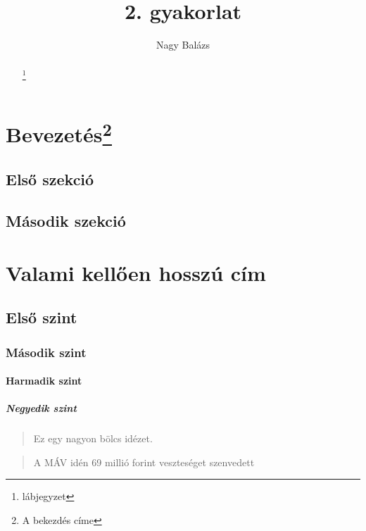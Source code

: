 \documentclass[12pt, twoside, twocolumn]{article}
\author{Nagy Balázs}
\title{2. gyakorlat}
\begin{document}
\setcounter{secnumdepth}{5}
\setcounter{tocdepth}{5}
\maketitle

\begin{abstract}
\hulipsum[4]
\footnote[5]{lábjegyzet}
\end{abstract}
\clearpage

\tableofcontents
{}

\clearpage

\section[Prologue]{Bevezetés\footnote[4]{A bekezdés címe}}

\subsection{Első szekció}
\hulipsum[4]

\subsection{Második szekció}
\marginpar{\hulipsum[1]}
\hulipsum[13]

\section{Valami kellően hosszú cím}
\subsection{Első szint}
\subsubsection{Második szint}
\paragraph{Harmadik szint}
\subparagraph{Negyedik szint}

\begin{quote}
Ez egy nagyon bölcs idézet.
\end{quote}

\begin{quotation}
A MÁV idén 69 millió forint veszteséget szenvedett
\end{quotation}
\end{document}
